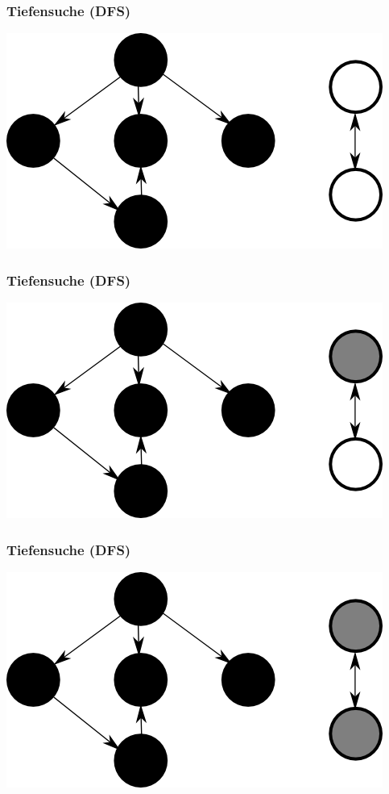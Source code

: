 \documentclass{beamer}
\begin{document}
\begin{frame}
\frametitle{Tiefensuche (DFS)}
\begin{center}
\includegraphics{dfs10}
\end{center}
\end{frame}


\begin{frame}
\frametitle{Tiefensuche (DFS)}
\begin{center}
\includegraphics{dfs11}
\end{center}
\end{frame}


\begin{frame}
\frametitle{Tiefensuche (DFS)}
\begin{center}
\includegraphics{dfs12}
\end{center}
\end{frame}
\end{document}
